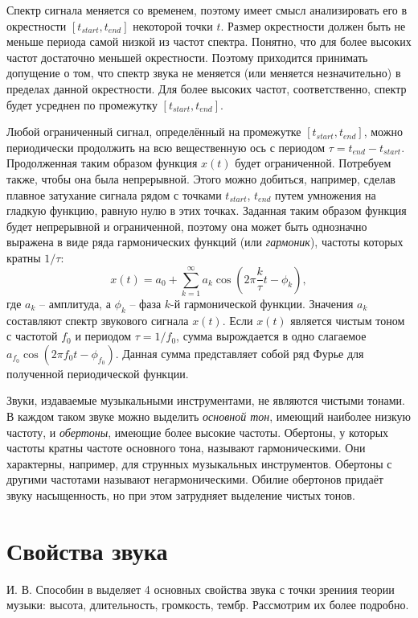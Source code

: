 Спектр сигнала меняется со временем, поэтому имеет смысл анализировать его в
окрестности $[t_{start}, t_{end}]$ некоторой точки $t$. Размер окрестности
должен быть не меньше периода самой низкой из частот спектра. Понятно, что для
более высоких частот достаточно меньшей окрестности. Поэтому приходится
принимать допущение о том, что спектр звука не меняется (или меняется
незначительно) в пределах данной окрестности. Для более высоких частот,
соответственно, спектр будет усреднен по промежутку $[t_{start}, t_{end}]$.

Любой ограниченный сигнал, определённый на промежутке $[t_{start}, t_{end}]$,
можно периодически продолжить на всю вещественную ось с периодом $\tau = t_{end}
- t_{start}$. Продолженная таким образом функция $x(t)$ будет ограниченной.
Потребуем также, чтобы она была непрерывной. Этого можно добиться, например,
сделав плавное затухание сигнала рядом с точками $t_{start}$, $t_{end}$ путем
умножения на гладкую функцию, равную нулю в этих точках. Заданная таким
образом функция будет непрерывной и ограниченной, поэтому она может быть
однозначно выражена в виде ряда гармонических функций (или \emph{гармоник}),
частоты которых кратны $1 / \tau$:
$$x(t) = a_0 + \sum_{k=1}^\infty a_k \cos \left(2\pi \frac{k}{\tau} t - \phi_k
\right),$$ где $a_k$ -- амплитуда, а $\phi_k$ -- фаза $k$-й гармонической
функции. Значения $a_k$ составляют спектр звукового сигнала $x(t)$. Если $x(t)$
является чистым тоном с частотой $f_0$ и периодом $\tau = 1/f_0$, сумма
вырождается в одно слагаемое $a_{f_0} \cos(2 \pi f_0 t - \phi_{f_0})$. Данная
сумма представляет собой ряд Фурье для полученной периодической функции.

Звуки, издаваемые музыкальными инструментами, не являются чистыми тонами. В
каждом таком звуке можно выделить \emph{основной тон}, имеющий наиболее низкую
частоту, и \emph{обертоны}, имеющие более высокие частоты. Обертоны, у которых
частоты кратны частоте основного тона, называют гармоническими. Они
характерны, например, для струнных музыкальных инструментов. Обертоны с другими
частотами называют негармоническими. Обилие обертонов придаёт звуку
насыщенность, но при этом затрудняет выделение чистых тонов.

\section{Свойства звука} \label{sectT_prop}

И. В. Способин в \cite{Sposobin2012} выделяет 4 основных свойства звука с точки
зрениия теории музыки: высота, длительность, громкость, тембр. Рассмотрим их
более подробно.

